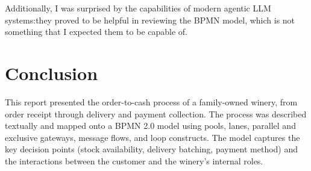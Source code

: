 \documentclass[11pt,a4paper]{article}
\begin{document}
Additionally, I was surprised by the capabilities of modern agentic LLM systems:they proved to be helpful in reviewing the BPMN model, which is not something that I expected them to be capable of.

\section{Conclusion}

This report presented the order-to-cash process of a family-owned winery, from order receipt through delivery and payment collection.
The process was described textually and mapped onto a BPMN 2.0 model using pools, lanes, parallel and exclusive gateways, message flows, and loop constructs.
The model captures the key decision points (stock availability, delivery batching, payment method) and the interactions between the customer and the winery's internal roles.
\end{document}
